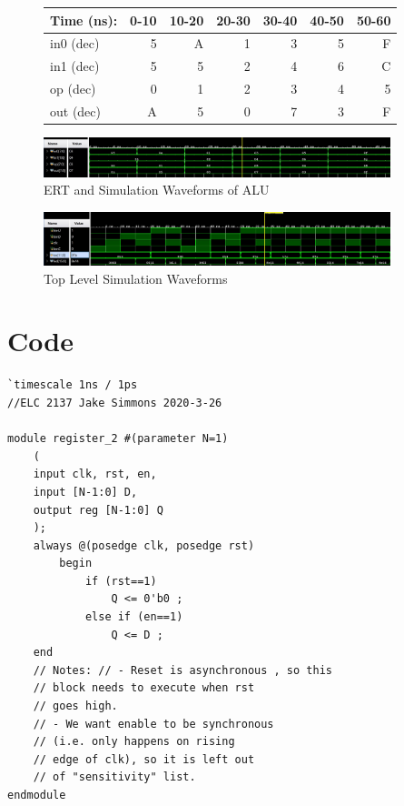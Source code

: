 \documentclass[11pt]{article}
\begin{document}
\begin{figure}[ht]\centering
	\begin{tabular}{l|rrrrrr}
		Time (ns): & 0-10 & 10-20 & 20-30 & 30-40 & 40-50 & 50-60  \\
		\midrule
		in0 (dec) & 5 & A & 1 & 3 & 5 & F \\
		in1 (dec) & 5 & 5 & 2 & 4 & 6 & C \\
		op (dec) & 0 & 1 & 2 & 3 & 4 & 5 \\
		\midrule 
		out (dec) & A & 5 & 0 & 7 & 3 & F \\
		\bottomrule
	\end{tabular}\medskip
	
		\includegraphics[width=0.9\textwidth]{ALU_test.JPG}
		\caption{ERT and Simulation Waveforms of ALU}
		\label{fig:sim_with_table}
\end{figure}

\begin{figure}[ht]\centering
	\includegraphics[width=0.9\textwidth]{top_module_test.JPG}
	\caption{Top Level Simulation Waveforms}
	\label{fig:sim}
	
\end{figure}


\clearpage
\section*{Code}

\begin{lstlisting}[style=Verilog,
caption=Register Module,
label=register 
]
`timescale 1ns / 1ps
//ELC 2137 Jake Simmons 2020-3-26

module register_2 #(parameter N=1) 
	(
	input clk, rst, en, 
	input [N-1:0] D, 
	output reg [N-1:0] Q 
	);
	always @(posedge clk, posedge rst) 
		begin       
			if (rst==1) 
				Q <= 0'b0 ; 
			else if (en==1) 
				Q <= D ; 
	end
	// Notes: // - Reset is asynchronous , so this 
	// block needs to execute when rst 
	// goes high.
	// - We want enable to be synchronous 
	// (i.e. only happens on rising 
	// edge of clk), so it is left out 
	// of "sensitivity" list.
endmodule

\end{lstlisting}
\end{document}
